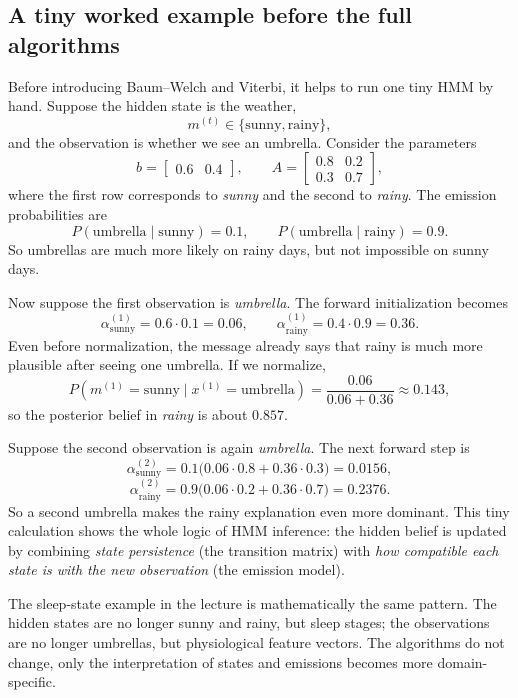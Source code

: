 \subsection{A tiny worked example before the full algorithms}

Before introducing Baum--Welch and Viterbi, it helps to run one tiny HMM by hand. Suppose the hidden state is the weather,
\[
  m^{(t)} \in \{\text{sunny},\text{rainy}\},
\]
and the observation is whether we see an umbrella. Consider the parameters
\[
  b=
  \begin{bmatrix}
    0.6 & 0.4
  \end{bmatrix},
  \qquad
  A=
  \begin{bmatrix}
    0.8 & 0.2\\
    0.3 & 0.7
  \end{bmatrix},
\]
where the first row corresponds to \emph{sunny} and the second to \emph{rainy}. The emission probabilities are
\[
  P(\text{umbrella}\mid \text{sunny})=0.1,
  \qquad
  P(\text{umbrella}\mid \text{rainy})=0.9.
\]
So umbrellas are much more likely on rainy days, but not impossible on sunny days.

Now suppose the first observation is \emph{umbrella}. The forward initialization becomes
\[
  \alpha_{\text{sunny}}^{(1)}=0.6\cdot 0.1=0.06,
  \qquad
  \alpha_{\text{rainy}}^{(1)}=0.4\cdot 0.9=0.36.
\]
Even before normalization, the message already says that rainy is much more plausible after seeing one umbrella. If we normalize,
\[
  P(m^{(1)}=\text{sunny}\mid x^{(1)}=\text{umbrella})
  =
  \frac{0.06}{0.06+0.36}
  \approx 0.143,
\]
so the posterior belief in \emph{rainy} is about $0.857$.

Suppose the second observation is again \emph{umbrella}. The next forward step is
\[
  \alpha_{\text{sunny}}^{(2)}
  =
  0.1\bigl(0.06\cdot 0.8 + 0.36\cdot 0.3\bigr)
  =0.0156,
\]
\[
  \alpha_{\text{rainy}}^{(2)}
  =
  0.9\bigl(0.06\cdot 0.2 + 0.36\cdot 0.7\bigr)
  =0.2376.
\]
So a second umbrella makes the rainy explanation even more dominant. This tiny calculation shows the whole logic of HMM inference: the hidden belief is updated by combining \emph{state persistence} (the transition matrix) with \emph{how compatible each state is with the new observation} (the emission model).

The sleep-state example in the lecture is mathematically the same pattern. The hidden states are no longer sunny and rainy, but sleep stages; the observations are no longer umbrellas, but physiological feature vectors. The algorithms do not change, only the interpretation of states and emissions becomes more domain-specific.

